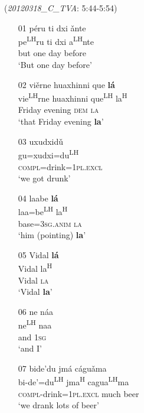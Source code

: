 \ea\label{list} (\textit{20120318{\_}C{\_}TVA}: 5:44-5:54)
\begin{itemize}
\item[01]
\glll p\'{e}ru ti dxi \v{a}nte \\
pe\textsuperscript{LH}ru ti dxi a\textsuperscript{LH}nte \\
but one day before \\
\glt  `But one day before'


\item[02]
\glll vi\v{e}rne huaxhinni que \textbf{l\'{a}} \\
vie\textsuperscript{LH}rne huaxhinni que\textsuperscript{LH} la\textsuperscript{H} \\
Friday evening \textsc{dem} \textsc{la} \\
\glt  `that Friday evening \textbf{la}'


\item[03]
\glll uxudxid\v{u} \\
gu=xudxi=du\textsuperscript{LH} \\
\textsc{compl}=drink=1\textsc{pl.excl} \\
\glt  `we got drunk'


\item[04]
\glll laabe \textbf{l\'{a}} \\
laa=be\textsuperscript{LH} la\textsuperscript{H} \\
base=3\textsc{sg.anim} \textsc{la} \\
\glt  `him (pointing) \textbf{la}'


\item[05]
\glll Vidal \textbf{l\'{a}} \\
Vidal la\textsuperscript{H} \\
Vidal \textsc{la} \\
\glt  `Vidal \textbf{la}'


\item[06]
\glll ne n\'{a}a \\
ne\textsuperscript{LH} naa \\
and 1\textsc{sg} \\
\glt  `and I'


\item[07]
\glll bide'du jm\'{a} c\'{a}gu\v{a}ma \\
bi-de'=du\textsuperscript{LH} jma\textsuperscript{H} cagua\textsuperscript{LH}ma \\
\textsc{compl}-drink=1\textsc{pl.excl} much beer \\
\glt  `we drank lots of beer'  

\end{itemize}
